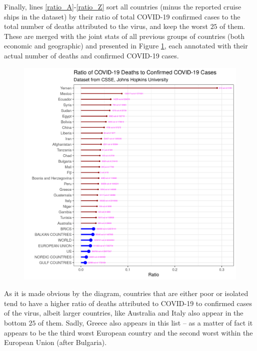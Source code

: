 Finally, lines \ref{ratio_A}-\ref{ratio_Z} sort all countries (minus the reported cruise ships in the dataset) by their ratio of total COVID-19 confirmed cases to the total number of deaths attributed to the virus, and keep the worst $25$ of them.
These are merged with the joint stats of all previous groups of countries (both economic and geographic) and presented in Figure \ref{fig:aggr_lollipop}, each annotated with their actual number of deaths and confirmed COVID-19 cases.

\begin{figure}[H]
\centering
\includegraphics[width=1\linewidth]{images/aggr_ratio_lollipop.png}
\label{fig:aggr_lollipop}
\end{figure}

As it is made obvious by the diagram, countries that are either poor or isolated tend to have a higher ratio of deaths attributed to COVID-19 to confirmed cases of the virus, albeit larger countries, like Australia and Italy also appear in the bottom $25$ of them.
Sadly, Greece also appears in this list -- as a matter of fact it appears to be the third worst European country and the second worst within the European Union (after Bulgaria).

